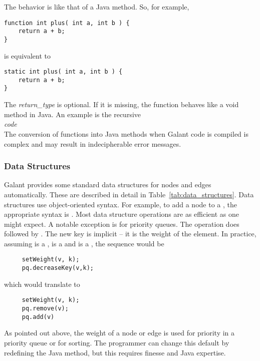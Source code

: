 The behavior is like that of a Java method. So, for example,
\begin{verbatim}
function int plus( int a, int b ) {
    return a + b;
}
\end{verbatim}
is equivalent to
\begin{verbatim}
static int plus( int a, int b ) {
    return a + b;
}
\end{verbatim}

The \textsl{return\_type} is optional. If it is missing, the function behaves like
a \textsf{void} method in Java. An example is the recursive
\\
 \textsl{code} \Code{\}}
\\
The conversion of functions into Java methods when Galant code is compiled
is complex and may result in indecipherable error messages.



\subsubsection{Data Structures}

Galant provides some standard data structures for nodes and edges automatically.
These are described in detail in Table~\ref{tab:data_structures}.
Data structures use object-oriented syntax.
For example, to add a node  to a  ,
the appropriate syntax is .
Most data structure operations are as efficient as one might expect.
A notable exception is 
for priority queues.
The operation 
does  followed by .
The new key is implicit -- it is the weight of the element.
In practice, assuming  is a ,
 is a 
and  is a , the sequence would be
\begin{verbatim}
     setWeight(v, k);
     pq.decreaseKey(v,k);
\end{verbatim}
which would translate to
\begin{verbatim}
     setWeight(v, k);
     pq.remove(v);
     pq.add(v)
\end{verbatim}
As pointed out above, the weight of a node or edge is used for priority in a priority
queue or for sorting.
The programmer can change this default
by redefining the Java  method,
but this requires finesse and Java expertise.

